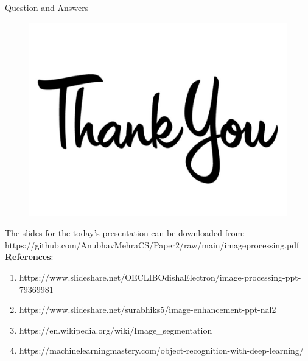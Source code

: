 \documentclass[12pt]{beamer}
\begin{document}
\begin{frame}{Question and Answers}
\begin{figure}
\begin{center}
\includegraphics[scale=0.2]{thank.jpg}
\end{center}
\end{figure}
\tiny
The slides for the today's presentation can be downloaded from: \\

https://github.com/AnubhavMehraCS/Paper2/raw/main/imageprocessing.pdf \\ [1ex]
\small
\textbf{References}:
\tiny
\begin{enumerate}
\item https://www.slideshare.net/OECLIBOdishaElectron/image-processing-ppt-79369981
\item https://www.slideshare.net/surabhiks5/image-enhancement-ppt-nal2
\item https://en.wikipedia.org/wiki/Image\_segmentation
\item https://machinelearningmastery.com/object-recognition-with-deep-learning/
\end{enumerate}
\normalsize
\end{frame}
\end{document}
